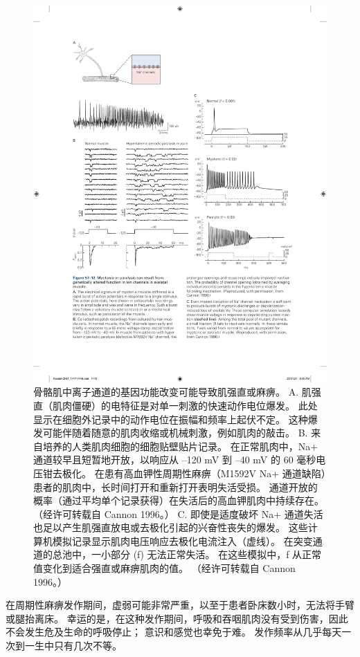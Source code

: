 \begin{figure}[htbp]
	\centering
	\includegraphics[width=0.95\linewidth]{chap57/fig_57_12}
	\caption{骨骼肌中离子通道的基因功能改变可能导致肌强直或麻痹。 A. 肌强直（肌肉僵硬）的电特征是对单一刺激的快速动作电位爆发。 此处显示在细胞外记录中的动作电位在振幅和频率上起伏不定。 这种爆发可能伴随着随意的肌肉收缩或机械刺激，例如肌肉的敲击。 B. 来自培养的人类肌肉细胞的细胞贴壁贴片记录。 在正常肌肉中，Na+ 通道较早且短暂地开放，以响应从 –120 mV 到 –40 mV 的 60 毫秒电压钳去极化。 在患有高血钾性周期性麻痹（M1592V Na+ 通道缺陷）患者的肌肉中，长时间打开和重新打开表明失活受损。 通道开放的概率（通过平均单个记录获得）在失活后的高血钾肌肉中持续存在。 （经许可转载自 Cannon 1996。） C. 即使是适度破坏 Na+ 通道失活也足以产生肌强直放电或去极化引起的兴奋性丧失的爆发。 这些计算机模拟记录显示肌肉电压响应去极化电流注入（虚线）。 在突变通道的总池中，一小部分 (f) 无法正常失活。 在这些模拟中，f 从正常值变化到适合强直或麻痹肌肉的值。 （经许可转载自 Cannon 1996。）}
	\label{fig:57_12}
\end{figure}


在周期性麻痹发作期间，虚弱可能非常严重，以至于患者卧床数小时，无法将手臂或腿抬离床。
幸运的是，在这种发作期间，呼吸和吞咽肌肉没有受到伤害，因此不会发生危及生命的呼吸停止；
意识和感觉也幸免于难。
发作频率从几乎每天一次到一生中只有几次不等。


